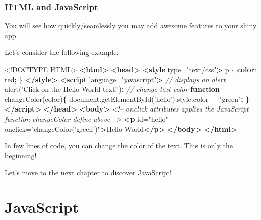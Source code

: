 \documentclass[
]{book}
\newenvironment{Shaded}{\begin{snugshade}}{\end{snugshade}}
\newcommand{\AttributeTok}[1]{\textcolor[rgb]{0.77,0.63,0.00}{#1}}
\newcommand{\CommentTok}[1]{\textcolor[rgb]{0.56,0.35,0.01}{\textit{#1}}}
\newcommand{\ConstantTok}[1]{\textcolor[rgb]{0.00,0.00,0.00}{#1}}
\newcommand{\DataTypeTok}[1]{\textcolor[rgb]{0.13,0.29,0.53}{#1}}
\newcommand{\KeywordTok}[1]{\textcolor[rgb]{0.13,0.29,0.53}{\textbf{#1}}}
\newcommand{\NormalTok}[1]{#1}
\newcommand{\OperatorTok}[1]{\textcolor[rgb]{0.81,0.36,0.00}{\textbf{#1}}}
\newcommand{\OtherTok}[1]{\textcolor[rgb]{0.56,0.35,0.01}{#1}}
\newcommand{\StringTok}[1]{\textcolor[rgb]{0.31,0.60,0.02}{#1}}
\newcommand{\VariableTok}[1]{\textcolor[rgb]{0.00,0.00,0.00}{#1}}
\begin{document}
\hypertarget{html-and-javascript}{%
\subsection{HTML and JavaScript}\label{html-and-javascript}}

You will see how quickly/seamlessly you may add awesome features to your shiny app.

Let's consider the following example:

\begin{Shaded}
\begin{Highlighting}[]
\DataTypeTok{<!DOCTYPE }\NormalTok{HTML}\DataTypeTok{>}
\KeywordTok{<html>}
  \KeywordTok{<head>}
    \KeywordTok{<style}\OtherTok{ type=}\StringTok{"text/css"}\KeywordTok{>}
\NormalTok{      p \{}
        \KeywordTok{color}\NormalTok{: }\ConstantTok{red}\OperatorTok{;}
\NormalTok{      \}}
    \KeywordTok{</style>}
    \KeywordTok{<script}\OtherTok{ language=}\StringTok{"javascript"}\KeywordTok{>}
      \CommentTok{// displays an alert }
      \AttributeTok{alert}\NormalTok{(}\StringTok{'Click on the Hello World text!'}\NormalTok{)}\OperatorTok{;}
      \CommentTok{// change text color}
      \KeywordTok{function} \AttributeTok{changeColor}\NormalTok{(color)}\OperatorTok{\{}
        \VariableTok{document}\NormalTok{.}\AttributeTok{getElementById}\NormalTok{(}\StringTok{'hello'}\NormalTok{).}\VariableTok{style}\NormalTok{.}\AttributeTok{color} \OperatorTok{=} \StringTok{"green"}\OperatorTok{;}
      \OperatorTok{\}}
    \KeywordTok{</script>}
  \KeywordTok{</head>}
  \KeywordTok{<body>}
    \CommentTok{<!-- onclick attributes applies the JavaScript function changeColor define above -->}
    \KeywordTok{<p}\OtherTok{ id=}\StringTok{"hello"}\OtherTok{ onclick=}\StringTok{"changeColor('green')"}\KeywordTok{>}\NormalTok{Hello World}\KeywordTok{</p>}
  \KeywordTok{</body>}
\KeywordTok{</html>}
\end{Highlighting}
\end{Shaded}

In few lines of code, you can change the color of the text. This is only the beginning!

Let's move to the next chapter to discover JavaScript!

\hypertarget{survival-kit-javascript}{%
\chapter{JavaScript}\label{survival-kit-javascript}}
\end{document}
